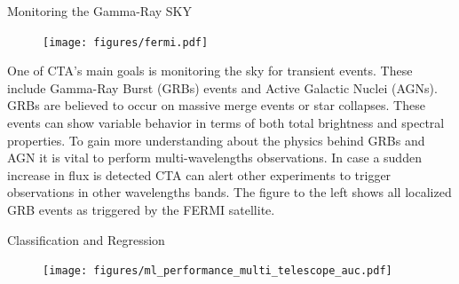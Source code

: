 \begin{multicols}{2}
    \begin{block}[equal height group=A]{Monitoring the Gamma-Ray SKY}%
      \begin{multicols}{2}
        \begin{figure}
          \texttt{[image: figures/fermi.pdf]}\\
        \end{figure}
        \columnbreak
        One of CTA's main goals is monitoring the sky for transient events. These include Gamma-Ray Burst (GRBs) events and
        Active Galactic Nuclei (AGNs).
        GRBs are believed to occur on massive merge events or star collapses.
        These events can show variable behavior in terms of both total brightness and spectral properties.
        To gain more understanding about the physics behind GRBs and AGN it is vital to perform multi-wavelengths observations.
        In case a sudden increase in  flux is detected CTA can alert other experiments to trigger observations in other wavelengths bands.
        The figure to the left shows all localized GRB events as triggered by the FERMI satellite.
      \end{multicols}
    \end{block}%


    \begin{block}[equal height group=A]{Classification and Regression}%
      \begin{multicols}{2}
        \begin{figure}
          \texttt{[image: figures/ml\_performance\_multi\_telescope\_auc.pdf]}\\
        \end{figure}
        \columnbreak


\end{multicols}
\end{block}
\end{multicols}
